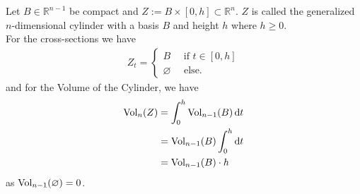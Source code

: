 \begin{example}
    Let \(B \in \mathbb{R}^{n-1}\) be compact and \(Z := B \times [0, h] \subset \mathbb{R}^n\). \(Z\) is called the generalized \(n\)-dimensional cylinder with a basis \(B\) and height \(h\) where \(h \geq 0\). \\
    For the cross-sections we have
    \begin{align}
        Z_t = \begin{cases}
            B \quad \text{ if } t \in [0, h] \\
            \varnothing \quad\text{ else.}
        \end{cases}
    \end{align}
    and for the Volume of the Cylinder, we have
    \begin{align}
        \text{Vol}_n(Z) &= \int_0^h \text{Vol}_{n-1}(B) \mathop{}\!\mathrm{d} t \\
        &= \text{Vol}_{n-1}(B) \int_0^h \mathop{}\!\mathrm{d} t \\
        &= \text{Vol}_{n-1}(B) \cdot h
    \end{align}
    as \(\text{Vol}_{n-1} (\varnothing) = 0\).
\end{example}